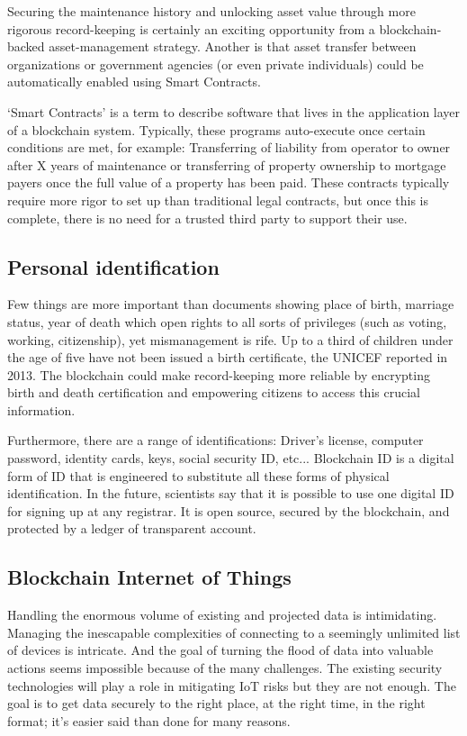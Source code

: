 \documentclass[a4paper]{article}
\begin{document}
	Securing the maintenance history and unlocking asset value through more rigorous record-keeping is certainly an exciting opportunity from a blockchain-backed asset-management strategy. Another is that asset transfer between organizations or government agencies (or even private individuals) could be automatically enabled using Smart Contracts.
	
	‘Smart Contracts’ is a term to describe software that lives in the application layer of a blockchain system. Typically, these programs auto-execute once certain conditions are met, for example: Transferring of liability from operator to owner after X years of maintenance or transferring of property ownership to mortgage payers once the full value of a property has been paid. These contracts typically require more rigor to set up than traditional legal contracts, but once this is complete, there is no need for a trusted third party to support their use.
	
	\subsection{Personal identification}
	Few things are more important than documents showing place of  birth, marriage status, year of death which open rights to all sorts of privileges (such as voting, working, citizenship), yet mismanagement is rife. Up to a third of children under the age of five have not been issued a birth certificate, the UNICEF reported in 2013.  The blockchain could make record-keeping more reliable by encrypting birth and death certification and empowering citizens to access this crucial information.
	
	Furthermore, there are a range of identifications: Driver’s license, computer password, identity cards, keys, social security ID, etc... Blockchain ID is a digital form of ID that is engineered to substitute all these forms of physical identification. In the future, scientists say that it is possible to use one digital ID for signing up at any registrar. It is open source, secured by the blockchain, and protected by a ledger of transparent account.
	
	\subsection{Blockchain Internet of Things}
	Handling the enormous volume of existing and projected data is intimidating. Managing the inescapable complexities of connecting to a seemingly unlimited list of devices is intricate. And the goal of turning the flood of data into valuable actions seems impossible because of the many challenges. The existing security technologies will play a role in mitigating IoT risks but they are not enough. The goal is to get data securely to the right place, at the right time, in the right format; it’s easier said than done for many reasons.
	
\end{document}
